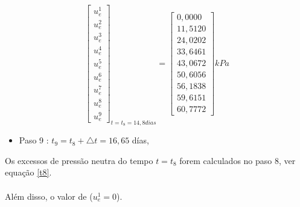 \documentclass{article} %
\begin{document}
\begin{equation}\label{t8}
\begin{bmatrix}
u_e^1\\
u_e^2\\
u_e^3\\
u_e^4\\
u_e^5\\
u_e^6\\
u_e^7\\
u_e^8\\
u_e^9
\end{bmatrix}_{t=t_8=14,8dias}=\begin{bmatrix}
0,0000\\
11,5120\\
24,0202\\
33,6461\\
43,0672\\
50,6056\\
56,1838\\
59,6151\\
60,7772
\end{bmatrix}kPa
\end{equation}

\begin{itemize}
	\item Paso 9 : \(t_9=t_8+\triangle t=16,65\) días,
\end{itemize}

Os excessos de pressão neutra do tempo \(t=t_8\) forem calculados no paso 8, ver equação \ref{t8}.\\
\\
\indent Além disso, o valor de (\(u_e^1=0\)).\\
\end{document}
